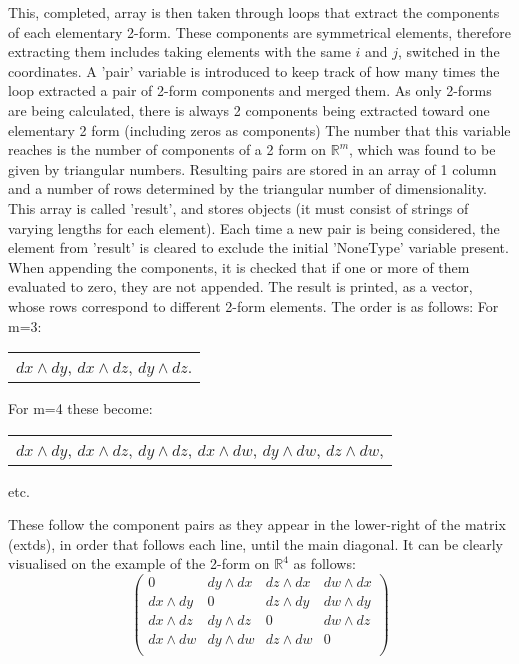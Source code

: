 \documentclass[11]{report}
\begin{document}
\noindent This, completed, array is then taken through loops that extract the components of each elementary 2-form. These components are symmetrical elements, therefore extracting them includes taking elements with the same $i$ and $j$, switched in the coordinates. A 'pair' variable is introduced to keep track of how many times the loop extracted a pair of 2-form components and merged them. As only 2-forms are being calculated, there is always 2 components being extracted toward one elementary 2 form (including zeros as components) The number that this variable reaches is the number of components of a 2 form on $\mathbb{R}^{m}$, which was found to be given by triangular numbers. Resulting pairs are stored in an array of 1 column and a number of rows determined  by the triangular number of dimensionality. This array is called 'result', and stores objects (it must consist of strings of varying lengths for each element). Each time a new pair is being considered, the element from 'result' is cleared to exclude the initial 'NoneType' variable present. When appending the components, it is checked that if one or more of them evaluated to zero, they are not appended.
The result is printed, as a vector, whose rows correspond to different 2-form elements. The order is as follows:
For m=3:
\begin{center}
	\begin{tabular}{c}
		$ dx \wedge dy$, 
		$ dx \wedge dz$, 
		$ dy \wedge dz$.
	\end{tabular}
\end{center}

For m=4 these become:

\begin{center}
	\begin{tabular}{c}
		$ dx \wedge dy$,
		$ dx \wedge dz$,
		$ dy \wedge dz$,
		$ dx \wedge dw$,
		$ dy \wedge dw$,
		$ dz \wedge dw$,
		
	\end{tabular}
\end{center}
etc.

These follow the component pairs as they appear in the lower-right of the matrix (ext\textunderscore ds), in order that follows each line, until the main diagonal.
It can be clearly visualised on the example of the 2-form on $\mathbb{R}^{4}$ as follows:
\begin{equation}
		\begin{pmatrix}
			0 & dy \wedge dx & dz \wedge dx & dw \wedge dx \\
			dx \wedge dy & 0 & dz \wedge dy & dw \wedge dy \\
			dx \wedge dz & dy \wedge dz & 0 & dw \wedge dz \\
			dx \wedge dw & dy \wedge dw & dz \wedge dw & 0 \\
		\end{pmatrix}
\end{equation}
\end{document}
